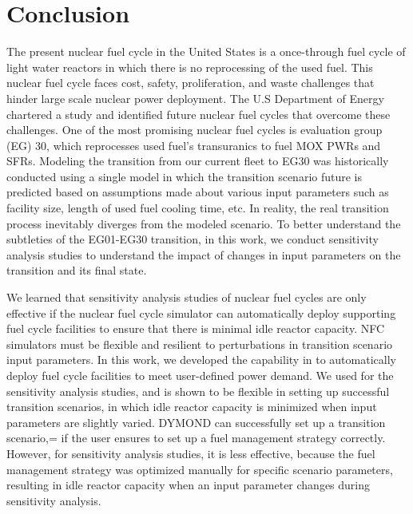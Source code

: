 \chapter{Conclusion}

The present nuclear fuel cycle in the United States is a once-through 
fuel cycle of light water reactors in which there is no reprocessing 
of the used fuel. 
This nuclear fuel cycle faces cost, safety, proliferation, and waste 
challenges that hinder large scale nuclear power deployment. 
The U.S Department of Energy chartered a study and identified future 
nuclear fuel cycles that overcome these challenges.  
One of the most promising nuclear fuel cycles is evaluation group (EG) 30, 
which reprocesses used fuel's transuranics to fuel \gls{MOX} \glspl{PWR}
and \glspl{SFR}. 
Modeling the transition from our current fleet to EG30 was historically 
conducted using a single model in which the transition scenario future 
is predicted based on assumptions made about various input parameters 
such as facility size, length of used fuel cooling time, etc. 
In reality, the real transition process inevitably diverges from the 
modeled scenario. 
To better understand the subtleties of the EG01-EG30 transition,
in this work, we conduct sensitivity analysis studies to 
understand the impact of changes in input parameters on the transition 
and its final state. 

We learned that sensitivity analysis studies of nuclear fuel cycles 
are only effective if the nuclear fuel cycle simulator can 
automatically deploy supporting fuel cycle facilities 
to ensure that there is minimal idle reactor capacity. 
NFC simulators must be flexible and resilient to 
perturbations in transition scenario input parameters. 
In this work, we developed the \deploy capability in \Cyclus to 
automatically deploy fuel cycle facilities to meet user-defined 
power demand. 
We used \deploy for the sensitivity analysis studies, and \Cyclus 
is shown to be flexible in setting up successful transition 
scenarios, in which idle reactor capacity is minimized
when input parameters are slightly varied.
DYMOND can successfully set up a transition scenario,= if the 
user ensures to set up a fuel management strategy correctly. 
However, for sensitivity analysis studies, it is less effective, 
because the fuel management strategy was optimized manually for specific 
scenario parameters, resulting in idle reactor capacity when 
an input parameter changes during sensitivity analysis.

